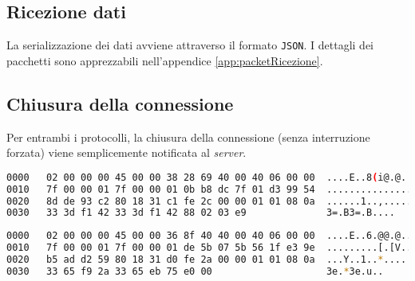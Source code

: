 \subsection{Ricezione dati}
\label{sub:packetRicezione}

La serializzazione dei dati avviene attraverso il formato \verb+JSON+.
I dettagli dei pacchetti sono apprezzabili nell'appendice \ref{app:packetRicezione}.

\subsection{Chiusura della connessione}
\label{sub:packetChiusura}

Per entrambi i protocolli, la chiusura della connessione (senza interruzione forzata) viene semplicemente notificata al \textit{server}.

\begin{lstlisting}[language=bash, label={lst:packetChiusuraHtttp}, captionpos=b, caption={HTTP Chiusura della connessione}, basicstyle=\scriptsize\ttfamily]
0000   02 00 00 00 45 00 00 38 28 69 40 00 40 06 00 00  ....E..8(i@.@...
0010   7f 00 00 01 7f 00 00 01 0b b8 dc 7f 01 d3 99 54  ...............T
0020   8d de 93 c2 80 18 31 c1 fe 2c 00 00 01 01 08 0a  ......1..,......
0030   33 3d f1 42 33 3d f1 42 88 02 03 e9              3=.B3=.B....
\end{lstlisting}

\begin{lstlisting}[language=bash, label={lst:packetChiusuraMqtt}, captionpos=b, caption={MQTT Chiusura della connessione}, basicstyle=\scriptsize\ttfamily]
0000   02 00 00 00 45 00 00 36 8f 40 40 00 40 06 00 00  ....E..6.@@.@...
0010   7f 00 00 01 7f 00 00 01 de 5b 07 5b 56 1f e3 9e  .........[.[V...
0020   b5 ad d2 59 80 18 31 d0 fe 2a 00 00 01 01 08 0a  ...Y..1..*......
0030   33 65 f9 2a 33 65 eb 75 e0 00                    3e.*3e.u..
\end{lstlisting}
